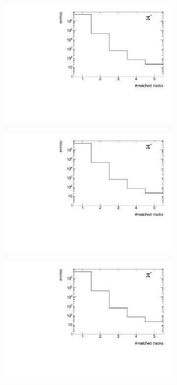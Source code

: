 \begin{figure}[h!]
	\centering
	\begin{subfigure}{.49\textwidth}
		\includegraphics[width=\textwidth,page=25]{chapters/chrgSTAR/img/tpcEffi/trackSplitting_CD.pdf}
	\end{subfigure}
	\begin{subfigure}{.49\textwidth}
		\includegraphics[width=\textwidth,page=26]{chapters/chrgSTAR/img/tpcEffi/trackSplitting_CD.pdf}
	\end{subfigure}
	\begin{subfigure}{.49\textwidth}
		\includegraphics[width=\textwidth,page=27]{chapters/chrgSTAR/img/tpcEffi/trackSplitting_CD.pdf}

\end{subfigure}
\end{figure}
